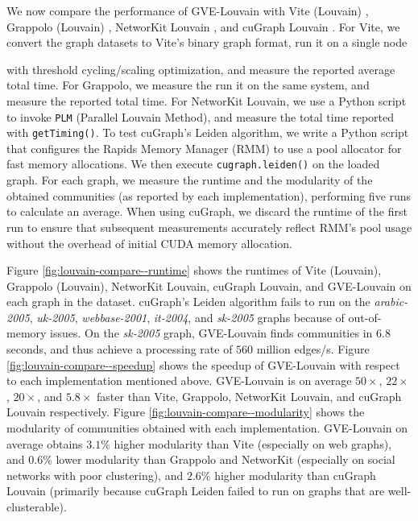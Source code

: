 We now compare the performance of GVE-Louvain with Vite (Louvain) \cite{ghosh2018scalable}, Grappolo (Louvain) \cite{com-halappanavar17}, NetworKit Louvain \cite{staudt2016networkit}, and cuGraph Louvain \cite{kang2023cugraph}. For Vite, we convert the graph datasets to Vite's binary graph format, run it on a single node with threshold cycling/scaling optimization, and measure the reported average total time. For Grappolo, we measure the run it on the same system, and measure the reported total time. For NetworKit Louvain, we use a Python script to invoke \texttt{PLM} (Parallel Louvain Method), and measure the total time reported with \texttt{getTiming()}. To test cuGraph's Leiden algorithm, we write a Python script that configures the Rapids Memory Manager (RMM) to use a pool allocator for fast memory allocations. We then execute \texttt{cugraph.leiden()} on the loaded graph. For each graph, we measure the runtime and the modularity of the obtained communities (as reported by each implementation), performing five runs to calculate an average. When using cuGraph, we discard the runtime of the first run to ensure that subsequent measurements accurately reflect RMM's pool usage without the overhead of initial CUDA memory allocation.

Figure \ref{fig:louvain-compare--runtime} shows the runtimes of Vite (Louvain), Grappolo (Louvain), NetworKit Louvain, cuGraph Louvain, and GVE-Louvain on each graph in the dataset. cuGraph's Leiden algorithm fails to run on the \textit{arabic-2005}, \textit{uk-2005}, \textit{webbase-2001}, \textit{it-2004}, and \textit{sk-2005} graphs because of out-of-memory issues. On the \textit{sk-2005} graph, GVE-Louvain finds communities in $6.8$ seconds, and thus achieve a processing rate of $560$ million edges/s. Figure \ref{fig:louvain-compare--speedup} shows the speedup of GVE-Louvain with respect to each implementation mentioned above. GVE-Louvain is on average $50\times$, $22\times$, $20\times$, and $5.8\times$ faster than Vite, Grappolo, NetworKit Louvain, and cuGraph Louvain respectively.  Figure \ref{fig:louvain-compare--modularity} shows the modularity of communities obtained with each implementation. GVE-Louvain on average obtains $3.1\%$ higher modularity than Vite (especially on web graphs), and $0.6\%$ lower modularity than Grappolo and NetworKit (especially on social networks with poor clustering), and $2.6\%$ higher modularity than cuGraph Louvain (primarily because cuGraph Leiden failed to run on graphs that are well-clusterable).

